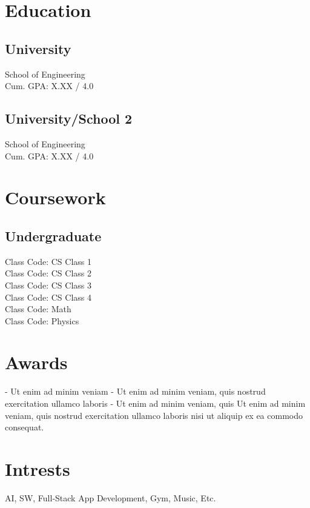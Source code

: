\documentclass[]{SWE-resume-openfont}
\begin{document}
\hfill
\begin{minipage}[t]{0.32\textwidth} 


\section{Education} 
\subsection{University}
School of Engineering \\
Cum. GPA: X.XX / 4.0 \\
\hfill

\subsection{University/School 2}
School of Engineering \\
Cum. GPA: X.XX / 4.0 \\
\sectionsep


\section{Coursework}
\subsection{Undergraduate}
\location{}
Class Code: CS Class 1\\
Class Code: CS Class 2\\
Class Code: CS Class 3\\
Class Code: CS Class 4\\
Class Code: Math \\
Class Code: Physics\\
\sectionsep


\section{Awards} 
- Ut enim ad minim veniam
\newline
- Ut enim ad minim veniam, quis nostrud exercitation ullamco laboris
\newline
- Ut enim ad minim veniam, quis 
\sectionsep
\newline
{}
Ut enim ad minim veniam, quis nostrud exercitation ullamco laboris nisi ut aliquip ex ea commodo consequat.
\sectionsep

\section{Intrests} 
AI, SW, Full-Stack App Development, Gym, Music, Etc. \\
\sectionsep

\end{minipage}
\end{document}
